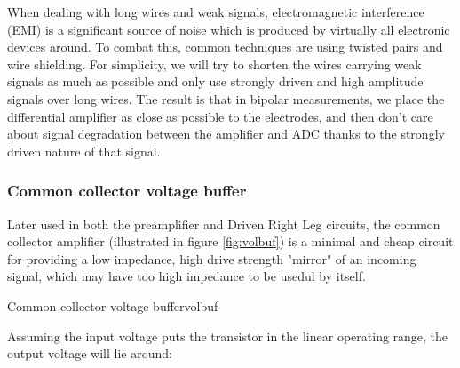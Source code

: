 \documentclass{thesis}
\begin{document}
When dealing with long wires and weak signals, electromagnetic interference (EMI) is a significant source of noise which is produced by virtually all electronic devices around. To combat this, common techniques are using twisted pairs and wire shielding. For simplicity, we will try to shorten the wires carrying weak signals as much as possible and only use strongly driven and high amplitude signals over long wires. The result is that in bipolar measurements, we place the differential amplifier as close as possible to the electrodes, and then don't care about signal degradation between the amplifier and ADC thanks to the strongly driven nature of that signal.

\subsubsection{Common collector voltage buffer}

Later used in both the preamplifier and Driven Right Leg circuits, the common collector amplifier (illustrated in figure \ref{fig:volbuf}) is a minimal and cheap circuit for providing a low impedance, high drive strength "mirror" of an incoming signal, which may have too high impedance to be usedul by itself.

\begin{thesisfigure}{Common-collector voltage buffer}{volbuf}

%

\end{thesisfigure}

Assuming the input voltage puts the transistor in the linear operating range, the output voltage will lie around:
\end{document}
